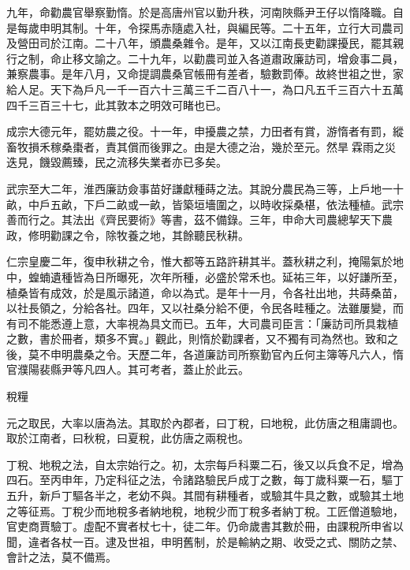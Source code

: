 \begin{pinyinscope}
 九年，命勸農官舉察勤惰。於是高唐州官以勤升秩，河南陜縣尹王仔以惰降職。自是每歲申明其制。十年，令探馬赤隨處入社，與編民等。二十五年，立行大司農司及營田司於江南。二十八年，頒農桑雜令。是年，又以江南長吏勸課擾民，罷其親行之制，命止移文諭之。二十九年，以勸農司並入各道肅政廉訪司，增僉事二員，兼察農事。是年八月，又命提調農桑官帳冊有差者，驗數罰俸。故終世祖之世，家給人足。天下為戶凡一千一百六十三萬三千二百八十一，為口凡五千三百六十五萬四千三百三十七，此其敦本之明效可睹也已。



 成宗大德元年，罷妨農之役。十一年，申擾農之禁，力田者有賞，游惰者有罰，縱畜牧損禾稼桑棗者，責其償而後罪之。由是大德之治，幾於至元。然旱霖雨之災迭見，饑毀薦臻，民之流移失業者亦已多矣。



 武宗至大二年，淮西廉訪僉事苗好謙獻種蒔之法。其說分農民為三等，上戶地一十畝，中戶五畝，下戶二畝或一畝，皆築垣墻圍之，以時收採桑椹，依法種植。武宗善而行之。其法出《齊民要術》等書，茲不備錄。三年，申命大司農總挈天下農政，修明勸課之令，除牧養之地，其餘聽民秋耕。



 仁宗皇慶二年，復申秋耕之令，惟大都等五路許耕其半。蓋秋耕之利，掩陽氣於地中，蝗蝻遺種皆為日所曝死，次年所種，必盛於常禾也。延祐三年，以好謙所至，植桑皆有成效，於是風示諸道，命以為式。是年十一月，令各社出地，共蒔桑苗，以社長領之，分給各社。四年，又以社桑分給不便，令民各畦種之。法雖屢變，而有司不能悉遵上意，大率視為具文而已。五年，大司農司臣言：「廉訪司所具栽植之數，書於冊者，類多不實。」觀此，則惰於勸課者，又不獨有司為然也。致和之後，莫不申明農桑之令。天歷二年，各道廉訪司所察勤官內丘何主簿等凡六人，惰官濮陽裴縣尹等凡四人。其可考者，蓋止於此云。



 稅糧



 元之取民，大率以唐為法。其取於內郡者，曰丁稅，曰地稅，此仿唐之租庸調也。取於江南者，曰秋稅，曰夏稅，此仿唐之兩稅也。



 丁稅、地稅之法，自太宗始行之。初，太宗每戶科粟二石，後又以兵食不足，增為四石。至丙申年，乃定科征之法，令諸路驗民戶成丁之數，每丁歲科粟一石，驅丁五升，新戶丁驅各半之，老幼不與。其間有耕種者，或驗其牛具之數，或驗其土地之等征焉。丁稅少而地稅多者納地稅，地稅少而丁稅多者納丁稅。工匠僧道驗地，官吏商賈驗丁。虛配不實者杖七十，徒二年。仍命歲書其數於冊，由課稅所申省以聞，違者各杖一百。逮及世祖，申明舊制，於是輸納之期、收受之式、關防之禁、會計之法，莫不備焉。




\end{pinyinscope}
